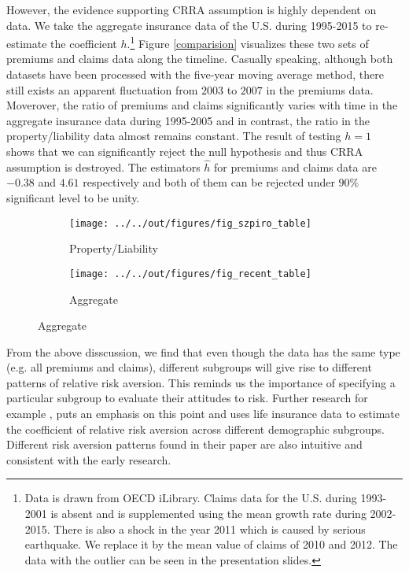 \documentclass[11pt, a4paper, leqno]{article}
\begin{document}
However, the evidence supporting CRRA assumption is highly dependent on data. We take the aggregate insurance data of the U.S. during 1995-2015 to re-estimate the coefficient $h$.\footnote{Data is drawn from OECD iLibrary. Claims data for the U.S. during 1993-2001 is absent and is supplemented using the mean growth rate during 2002-2015. There is also a shock in the year 2011 which is caused by serious earthquake. We replace it by the mean value of claims of 2010 and 2012. The data with the outlier can be seen in the presentation slides.} Figure \ref{comparision} visualizes these two sets of premiums and claims data along the timeline. Casually speaking, although both datasets have been processed with the five-year moving average method, there still exists an apparent fluctuation from $2003$ to $2007$ in the premiums data. Moverover, the ratio of premiums and claims significantly varies with time in the aggregate insurance data during 1995-2005 and in contrast, the ratio in the property/liability data almost remains constant. The result of testing $h=1$ shows that we can significantly reject the null hypothesis and thus CRRA assumption is destroyed. The estimators $\hat{h}$ for premiums and claims data are $-0.38$ and $4.61$ respectively and both of them can be rejected under $90\%$ significant level to be unity.

\begin{figure}[H]
\centering
{}
\caption{Comparison between Property/Liability Insurance Data and Aggregate Insurance Data}

\begin{subfigure}{0.5\textwidth}
    \centering
    \texttt{[image: ../../out/figures/fig\_szpiro\_table]}
    \caption{Property/Liability}
\end{subfigure}
\begin{subfigure}{0.5\textwidth}
    \centering
    \texttt{[image: ../../out/figures/fig\_recent\_table]}
    \caption{Aggregate}
\end{subfigure}

\end{figure}\label{comparision}

From the above disscussion, we find that even though the data has the same type (e.g. all premiums and claims),  different subgroups will give rise to different patterns of relative risk aversion. This reminds us the importance of specifying a particular subgroup to evaluate their attitudes to risk. Further research for example \citet{halek2001demography}, puts an emphasis on this point and uses life insurance data to estimate the coefficient of relative risk aversion across different demographic subgroups. Different risk aversion patterns found in their paper are also intuitive and consistent with the early research.
\end{document}
